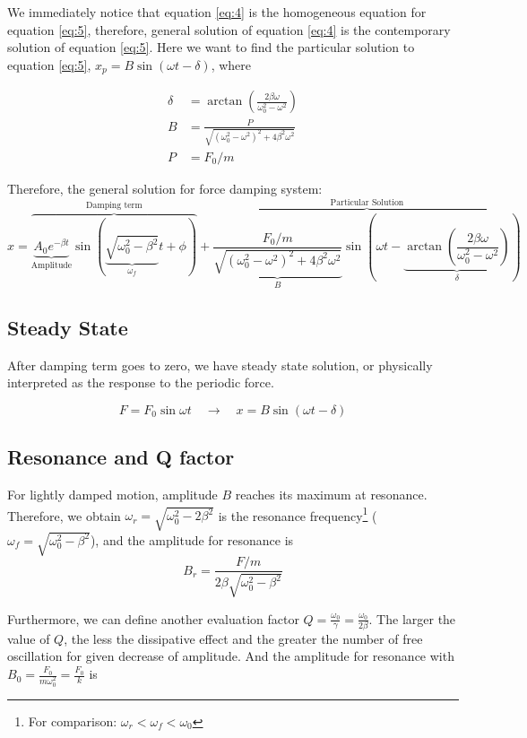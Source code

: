 \documentclass[openany]{book}
\begin{document}
We immediately notice that equation \eqref{eq:4} is the homogeneous equation for equation \eqref{eq:5}, therefore, general solution of equation \eqref{eq:4} is the contemporary solution of equation \eqref{eq:5}. Here we want to find the particular solution to equation \eqref{eq:5}, $x_p=B\sin (\omega t-\delta )$, where 

\begin{align*}
\delta &=\arctan \left(\frac{2\beta \omega }{\omega _0^2-\omega ^2}\right)\\
B &=\frac{P}{\sqrt{\left(\omega _0^2-\omega ^2\right)^2+4\beta ^2\omega ^2}}\\
P &={F_0}/{m}
\end{align*}

Therefore, the general solution for force damping system:
\[x=\overbrace{\underbrace{A_0e^{-\beta t}}_\text{Amplitude}\sin (\underbrace{\sqrt{\omega _0^2-\beta ^2}}_{\omega _f} t+\phi )}^\text{Damping term}+\overbrace{\underbrace{\frac{{F_0}/{m}}{\sqrt{\left(\omega _0^2-\omega ^2\right)^2+4\beta ^2\omega ^2}}}_{B}\sin (\omega t-\underbrace{\arctan \left(\frac{2\beta \omega }{\omega _0^2-\omega ^2}\right)}_{\delta })}^\text{Particular Solution}\]

\subsection{Steady State}
After damping term goes to zero, we have steady state solution, or physically interpreted as the response to the periodic force.

\[F=F_0\sin \omega t \quad \to \quad x=B\sin (\omega t-\delta )\]

\subsection{Resonance and Q factor}
For lightly damped motion, amplitude $B$ reaches its maximum at resonance. Therefore, we obtain $\omega _r=\sqrt{\omega _0^2-2\beta ^2}$ is the resonance frequency\footnote{For comparison: $\omega _r<\omega _f<\omega _0$} ($\omega _f=\sqrt{\omega _0^2-\beta ^2}$), and the amplitude for resonance is
\[B_r=\frac{F/m}{2\beta \sqrt{\omega _0^2-\beta ^2}}\]

Furthermore, we can define another evaluation factor $Q=\frac{\omega _0}{\gamma }=\frac{\omega _0}{2\beta }$. The larger the value of $Q$, the less the dissipative effect and the greater the number of free oscillation for given decrease of amplitude. And the amplitude for resonance with $B_0=\frac{F_0}{m\omega _0^2}=\frac{F_0}{k}$ is
\end{document}
